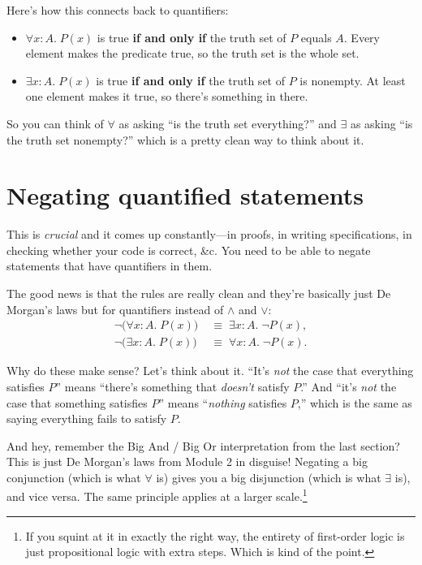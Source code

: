 \documentclass[11pt]{article}
\begin{document}
Here's how this connects back to quantifiers:
\begin{itemize}
  \item $\forall x : A.\; P(x)$ is true \textbf{if and only if} the truth set of $P$ equals $A$. Every element makes the predicate true, so the truth set is the whole set.
  \item $\exists x : A.\; P(x)$ is true \textbf{if and only if} the truth set of $P$ is nonempty. At least one element makes it true, so there's something in there.
\end{itemize}

So you can think of $\forall$ as asking ``is the truth set everything?'' and $\exists$ as asking ``is the truth set nonempty?'' which is a pretty clean way to think about it.

\section{Negating quantified statements}
This is \emph{crucial} and it comes up constantly---in proofs, in writing specifications, in checking whether your code is correct, \&c. You need to be able to negate statements that have quantifiers in them.

The good news is that the rules are really clean and they're basically just De Morgan's laws but for quantifiers instead of $\wedge$ and $\vee$:
\begin{align*}
  \lnot\bigl(\forall x : A.\; P(x)\bigr) &\;\equiv\; \exists x : A.\; \lnot P(x), \\
  \lnot\bigl(\exists x : A.\; P(x)\bigr) &\;\equiv\; \forall x : A.\; \lnot P(x).
\end{align*}

Why do these make sense? Let's think about it. ``It's \emph{not} the case that everything satisfies $P$'' means ``there's something that \emph{doesn't} satisfy $P$.'' And ``it's \emph{not} the case that something satisfies $P$'' means ``\emph{nothing} satisfies $P$,'' which is the same as saying everything fails to satisfy $P$.

And hey, remember the Big And / Big Or interpretation from the last section? This is just De Morgan's laws from Module 2 in disguise! Negating a big conjunction (which is what $\forall$ is) gives you a big disjunction (which is what $\exists$ is), and vice versa. The same principle applies at a larger scale.\footnote{If you squint at it in exactly the right way, the entirety of first-order logic is just propositional logic with extra steps. Which is kind of the point.}
\end{document}
